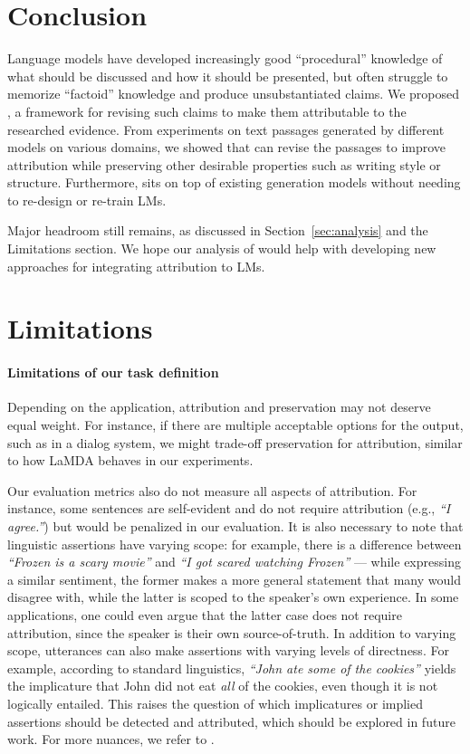 \section{Conclusion}
Language models have developed increasingly good ``procedural'' knowledge of what should be discussed and how it should be presented, but often struggle to memorize ``factoid'' knowledge and produce unsubstantiated claims.
We proposed \approach{}, a framework for revising such claims to make them attributable to the researched evidence.
From experiments on text passages generated by different models on various domains, we showed that \approach{} can revise the passages to improve attribution while preserving other desirable properties such as writing style or structure.
Furthermore, \approach{} sits on top of existing generation models without needing to re-design or re-train LMs.

Major headroom still remains, as discussed in Section~\ref{sec:analysis} and the Limitations section. We hope our analysis of \approach{} would help with developing new approaches for integrating attribution to LMs.


\section{Limitations}

\paragraph{Limitations of our task definition}
Depending on the application, attribution and preservation may not deserve equal weight. For instance, if there are multiple acceptable options for the output, such as in a dialog system, we might trade-off preservation for attribution, similar to how LaMDA behaves in our experiments.

Our evaluation metrics also do not measure all aspects of attribution. For instance, some sentences are self-evident and do not require attribution (e.g., \emph{``I agree.''}) but would be penalized in our evaluation.
It is also necessary to note that linguistic assertions have varying scope: for example, there is a difference between \emph{``Frozen is a scary movie''} and \emph{``I got scared watching Frozen''} --- while expressing a similar sentiment, the former makes a more general statement that many would disagree with, while the latter is scoped to the speaker's own experience. In some applications, one could even argue that the latter case does not require attribution, since the speaker is their own source-of-truth. In addition to varying scope, utterances can also make assertions with varying levels of directness. For example, according to standard linguistics, \emph{``John ate some of the cookies''} yields the implicature that John did not eat \emph{all} of the cookies, even though it is not logically entailed. This raises the question of which implicatures or implied assertions should be detected and attributed, which should be explored in future work. For more nuances, we refer to \citet{Rashkin2021AIS}.

